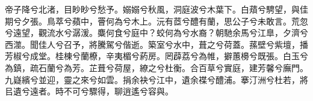 
\begin{pinyinscope}
帝子降兮北渚，目眇眇兮愁予。嫋嫋兮秋風，洞庭波兮木葉下。白薠兮騁望，與佳期兮夕張。鳥萃兮蘋中，罾何為兮木上。沅有茝兮醴有蘭，思公子兮未敢言。荒忽兮遠望，觀流水兮潺湲。麋何食兮庭中？蛟何為兮水裔？朝馳余馬兮江臯，夕濟兮西澨。聞佳人兮召予，將騰駕兮偕逝。築室兮水中，葺之兮荷蓋。蓀壁兮紫壇，播芳椒兮成堂。桂棟兮蘭橑，辛夷楣兮葯房。罔薜荔兮為帷，擗蕙櫋兮既張。白玉兮為鎮，疏石蘭兮為芳。芷葺兮荷屋，繚之兮杜衡。合百草兮實庭，建芳馨兮廡門。九嶷繽兮並迎，靈之來兮如雲。捐余袂兮江中，遺余褋兮醴浦。搴汀洲兮杜若，將㠯遺兮遠者。時不可兮驟得，聊逍遙兮容與。


\end{pinyinscope}